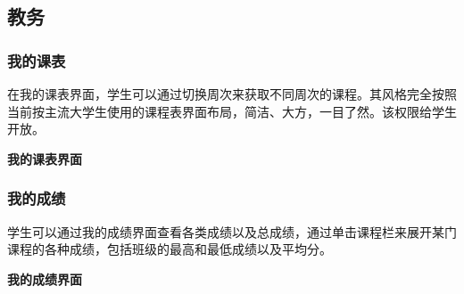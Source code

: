 \documentclass{article}
\begin{document}
\subsection{教务}

\subsubsection{我的课表}
在我的课表界面，学生可以通过切换周次来获取不同周次的课程。其风格完全按照当前按主流大学生使用的课程表界面布局，简洁、大方，一目了然。该权限给学生开放。
\begin{center}
\textbf{我的课表界面}
\end{center}

\subsubsection{我的成绩}
学生可以通过我的成绩界面查看各类成绩以及总成绩，通过单击课程栏来展开某门课程的各种成绩，包括班级的最高和最低成绩以及平均分。
\begin{center}
\textbf{我的成绩界面}
\end{center}
\end{document}
